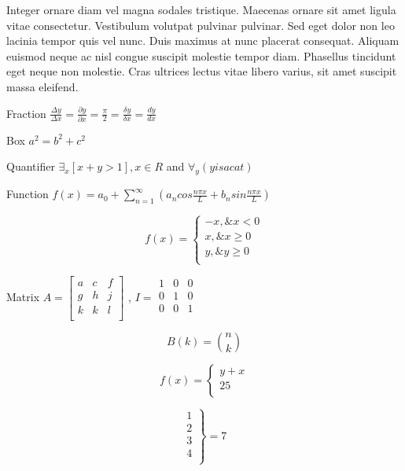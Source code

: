\documentclass{book}
\begin{document}
Integer ornare diam vel magna sodales tristique. Maecenas ornare sit amet ligula vitae consectetur. Vestibulum volutpat pulvinar pulvinar. Sed eget dolor non leo lacinia tempor quis vel nunc. Duis maximus at nunc placerat consequat. Aliquam euismod neque ac nisl congue suscipit molestie tempor diam. Phasellus tincidunt eget neque non molestie. Cras ultrices lectus vitae libero varius, sit amet suscipit massa eleifend.

Fraction $\frac{\Delta y}{\Delta x}=\frac{\partial y}{\partial x}=\frac{\pi }{2}=\frac{\delta y}{\delta x}=\frac{dy}{dx}$

Box $\boxed {{a}^{2}={b}^{2}+{c}^{2}}$

Quantifier ${\exists }_{x}[x+y>1], x\in R$	and  ${\forall }_{y}(y is a cat)$

Function $f(x)={a}_{0}+\sum _{n=1}^{\infty } ({a}_{n}cos\frac{n\pi x}{L}+{b}_{n}sin\frac{n\pi x}{L})$ 

$$f(x)=\left \{ \begin{array}{lr}
-x,  \& x<0 \\
x,  \& x\geq 0 \\
y,  \& y\geq 0 \\
\end{array} \right.$$

Matrix $A=\begin{bmatrix}
 a & c & f \\
g & h & j \\
k & k & l \\
 \end{bmatrix}
$ , $I= \begin{matrix}
 1 & 0 & 0 \\
0 & 1 & 0 \\
0 & 0 & 1 \\
 \end{matrix}
$

$$B(k)={n \choose k}$$

$$f(x)=\left \{ \begin{array}{lr}
y+x \\
25 \\
\end{array} \right.$$

$$\left. \begin{array}{lr}
1 \\
2 \\
3 \\
4 \\
\end{array} \right \}=7$$
\end{document}
